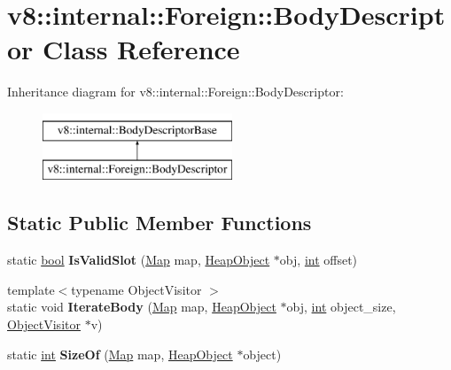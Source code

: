 \hypertarget{classv8_1_1internal_1_1Foreign_1_1BodyDescriptor}{}\section{v8\+:\+:internal\+:\+:Foreign\+:\+:Body\+Descriptor Class Reference}
\label{classv8_1_1internal_1_1Foreign_1_1BodyDescriptor}
Inheritance diagram for v8\+:\+:internal\+:\+:Foreign\+:\+:Body\+Descriptor\+:\begin{figure}[H]
\begin{center}
\leavevmode
\includegraphics[height=2.000000cm]{classv8_1_1internal_1_1Foreign_1_1BodyDescriptor}
\end{center}
\end{figure}
\subsection*{Static Public Member Functions}
\begin{DoxyCompactItemize}
\item 
\mbox{\label{classv8_1_1internal_1_1Foreign_1_1BodyDescriptor_ace0b111729a7d6329e0c412828529bb0}} 
static \mbox{\hyperlink{classbool}{bool}} {\bfseries Is\+Valid\+Slot} (\mbox{\hyperlink{classv8_1_1internal_1_1Map}{Map}} map, \mbox{\hyperlink{classv8_1_1internal_1_1HeapObject}{Heap\+Object}} $\ast$obj, \mbox{\hyperlink{classint}{int}} offset)
\item 
\mbox{\label{classv8_1_1internal_1_1Foreign_1_1BodyDescriptor_a41a10ea7ed7a6225731138ab48499094}} 
{\footnotesize template$<$typename Object\+Visitor $>$ }\\static void {\bfseries Iterate\+Body} (\mbox{\hyperlink{classv8_1_1internal_1_1Map}{Map}} map, \mbox{\hyperlink{classv8_1_1internal_1_1HeapObject}{Heap\+Object}} $\ast$obj, \mbox{\hyperlink{classint}{int}} object\+\_\+size, \mbox{\hyperlink{classv8_1_1internal_1_1ObjectVisitor}{Object\+Visitor}} $\ast$v)
\item 
\mbox{\label{classv8_1_1internal_1_1Foreign_1_1BodyDescriptor_ac96c42b5310fa1c5a0b290a3e9f33860}} 
static \mbox{\hyperlink{classint}{int}} {\bfseries Size\+Of} (\mbox{\hyperlink{classv8_1_1internal_1_1Map}{Map}} map, \mbox{\hyperlink{classv8_1_1internal_1_1HeapObject}{Heap\+Object}} $\ast$object)
\end{DoxyCompactItemize}
